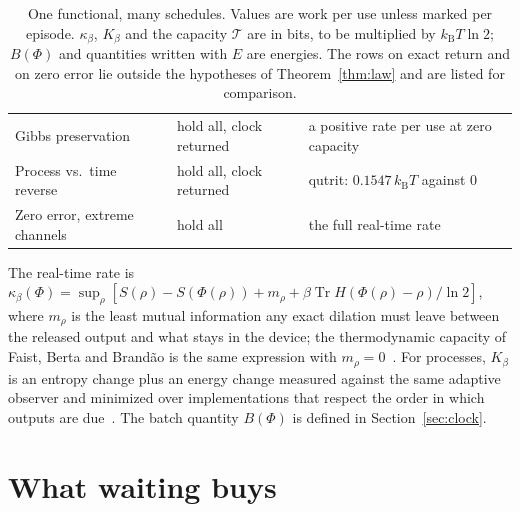 \documentclass[11pt]{article}
\theoremstyle{definition}
\theoremstyle{remark}
\newcommand{\Tr}{\operatorname{Tr}}
\newcommand{\kB}{k_{\mathrm B}}
\newcommand{\Trt}{\kappa_\beta}
\begin{document}
\begin{table}[tbp]
\begin{tabular}{>{\raggedright\arraybackslash}p{4.0cm}>{\raggedright\arraybackslash}p{3.2cm}>{\raggedright\arraybackslash}p{6.2cm}}
Gibbs preservation & hold all, clock returned & a positive rate per use at zero capacity~\cite{KeepingTime}\\
Process vs.\ time reverse & hold all, clock returned & qutrit: $0.1547\,\kB T$ against $0$~\cite{KeepingTime}\\
Zero error, extreme channels & hold all & the full real-time rate~\cite{SaveWork}\\
\bottomrule
\end{tabular}
\caption{One functional, many schedules. Values are work per use unless marked per episode. $\Trt$, $K_\beta$ and the capacity $\mathcal T$ are in bits, to be multiplied by $\kB T\ln2$; $B(\Phi)$ and quantities written with $E$ are energies. The rows on exact return and on zero error lie outside the hypotheses of Theorem~\ref{thm:law} and are listed for comparison.}\label{tab:corollaries}
\end{table}

The real-time rate is $\Trt(\Phi)=\sup_\rho[S(\rho)-S(\Phi(\rho))+m_\rho+\beta\Tr H(\Phi(\rho)-\rho)/\ln2]$, where $m_\rho$ is the least mutual information any exact dilation must leave between the released output and what stays in the device; the thermodynamic capacity of Faist, Berta and Brand\~ao is the same expression with $m_\rho=0$~\cite{FBB19,FBB21,SaveWork}. For processes, $K_\beta$ is an entropy change plus an energy change measured against the same adaptive observer and minimized over implementations that respect the order in which outputs are due~\cite{Answering}. The batch quantity $B(\Phi)$ is defined in Section~\ref{sec:clock}.

\section{What waiting buys}\label{sec:waiting}
\end{document}
